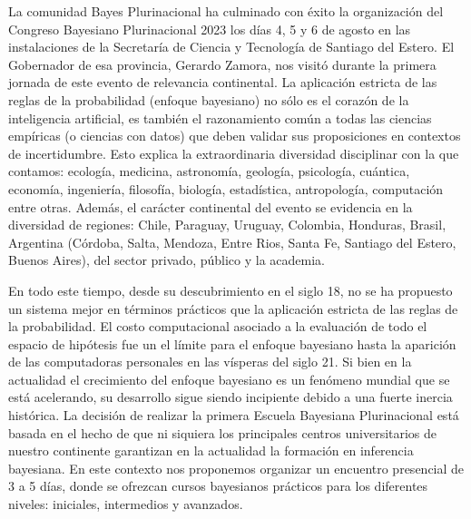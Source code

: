 \documentclass[a4paper,10pt]{letter}
\begin{document}
\begin{letter}
\hspace{1cm}
La comunidad Bayes Plurinacional ha culminado con éxito la organización del Congreso Bayesiano Plurinacional 2023 los días 4, 5 y 6 de agosto en las instalaciones de la Secretaría de Ciencia y Tecnología de Santiago del Estero.
%
El Gobernador de esa provincia, Gerardo Zamora, nos visitó durante la primera jornada de este evento de relevancia continental.
%
La aplicación estricta de las reglas de la probabilidad (enfoque bayesiano) no sólo es el corazón de la inteligencia artificial, es también el razonamiento común a todas las ciencias empíricas (o ciencias con datos) que deben validar sus proposiciones en contextos de incertidumbre.
%
Esto explica la extraordinaria diversidad disciplinar con la que contamos: ecología, medicina, astronomía, geología, psicología, cuántica, economía, ingeniería, filosofía, biología, estadística, antropología, computación entre otras.
%
Además, el carácter continental del evento se evidencia en la diversidad de regiones: Chile, Paraguay, Uruguay, Colombia, Honduras, Brasil, Argentina (Córdoba, Salta, Mendoza, Entre Rios, Santa Fe, Santiago del Estero, Buenos Aires), del sector privado, público y la academia.


\hspace{1cm} En todo este tiempo, desde su descubrimiento en el siglo 18, no se ha propuesto un sistema mejor en términos prácticos que la aplicación estricta de las reglas de la probabilidad.
%
El costo computacional asociado a la evaluación de todo el espacio de hipótesis fue un el límite para el enfoque bayesiano hasta la aparición de las computadoras personales en las vísperas del siglo 21.
%
Si bien en la actualidad el crecimiento del enfoque bayesiano es un fenómeno mundial que se está acelerando, su desarrollo sigue siendo incipiente debido a una fuerte inercia histórica.
%
La decisión de realizar la primera Escuela Bayesiana Plurinacional está basada en el hecho de que ni siquiera los principales centros universitarios de nuestro continente garantizan en la actualidad la formación en inferencia bayesiana.
%
En este contexto nos proponemos organizar un encuentro presencial de 3 a 5 días, donde se ofrezcan cursos bayesianos prácticos para los diferentes niveles: iniciales, intermedios y avanzados.



\end{letter}
\end{document}
